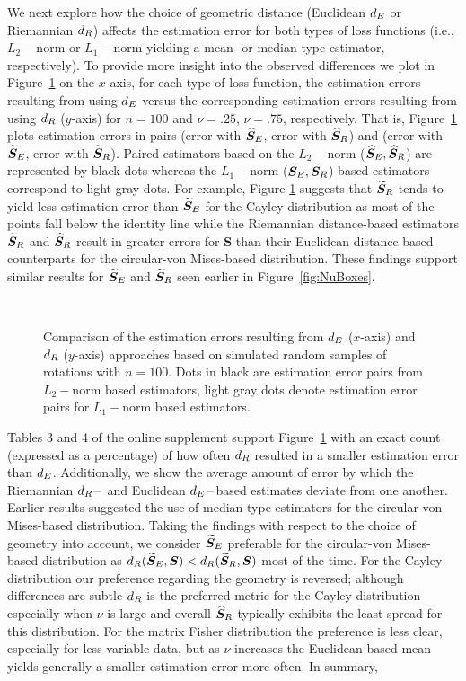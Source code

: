 We next explore how the choice of geometric distance (Euclidean ${d_E}$ or Riemannian ${d_R}$) affects the estimation error for both types of loss functions (i.e., $L_2-$norm or $L_1-$norm yielding a mean- or median type estimator, respectively). To provide more insight into the observed differences we plot in Figure~\ref{fig:comPL2} on the $x$-axis, for each type of loss function,  the estimation errors resulting from using ${d_E}$ versus the corresponding estimation errors resulting from using ${d_R}$ ($y$-axis) for $n=100$ and $\nu=.25$,  $\nu=.75$, respectively.  That is, Figure~\ref{fig:comPL2} plots estimation errors in pairs (error with ${\widehat{\bm S}_E}$, error with ${\widehat{\bm S}_R}$) and (error with ${\widetilde{\bm S}_E}$, error with ${\widetilde{\bm S}_R}$). Paired estimators based on the $L_2-$norm (${\widehat{\bm S}_E}, {\widehat{\bm S}_R}$) are represented by black dots whereas the $L_1-$norm (${\widetilde{\bm S}_E}, {\widetilde{\bm S}_R}$) based estimators correspond to light gray dots. For example, Figure \ref{fig:comPL2} suggests that  ${\widetilde{\bm S}_R}$ tends to yield less estimation error than ${\widetilde{\bm S}_E}$  for the Cayley distribution as most of the points fall below the identity line while the Riemannian distance-based estimators ${\widetilde{\bm S}_R}$ and ${\widehat{\bm S}_R}$ result in greater errors for ${\bm S}$ than their Euclidean distance based counterparts for the circular-von Mises-based distribution. These findings support similar results for ${\widetilde{\bm S}_E}$ and ${\widetilde{\bm S}_R}$ seen earlier in Figure~\ref{fig:NuBoxes}.
\begin{figure}[h!]
\centering
{}\\
\caption{Comparison of the estimation errors resulting from ${d_E}$ ($x$-axis) and ${d_R}$ ($y$-axis) approaches based on simulated random samples of rotations with $n=100$.  Dots in black are estimation error pairs from $L_2-$norm based estimators, light gray dots denote estimation error pairs for $L_1-$norm based estimators.}
\label{fig:comPL2}
\end{figure}
Tables 3 and 4 of the online supplement support Figure~\ref{fig:comPL2} with an exact count (expressed as a percentage) of how often ${d_R}$ resulted in a smaller estimation error than ${d_E}$.  Additionally, we show the average amount of error by which the Riemannian ${d_R}-$ and Euclidean ${d_E}-$based estimates deviate from one another.   
Earlier results suggested the use of median-type estimators for the circular-von Mises-based distribution. Taking the findings with respect to the choice of geometry into account, we consider ${\widetilde{\bm S}_E}$ preferable for the circular-von Mises-based distribution as ${d_R}({\widetilde{\bm S}_E},\bm S) < {d_R}({\widetilde{\bm S}_R},\bm S)$ most of the time.  For the Cayley distribution our preference regarding the geometry is reversed; although differences are subtle ${d_R}$ is the preferred metric for the Cayley distribution especially when $\nu$ is large and overall ${\widehat{\bm S}_R}$ typically exhibits the least spread for this distribution.   For the  matrix Fisher distribution the preference is less clear, especially for less variable data, but as $\nu$ increases the Euclidean-based mean yields generally a smaller estimation error more often. In summary,
